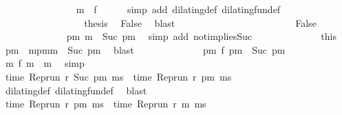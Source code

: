 \begin{isabellebody}
\ \ \ \ \ \ \ \ \ \ \ \ \ \ \isamarkupfalse%
\ {\isacartoucheopen}m\ {\isacharequal}\ f\ {}{\isacartoucheclose}\ \isamarkupfalse%
\ {\isacharasterisk}\ \isamarkupfalse%
\ {\isacharparenleft}simp\ add{\isacharcolon}\ dilating{\isacharunderscore}def\ dilating{\isacharunderscore}fun{\isacharunderscore}def{\isacharparenright}\isanewline
\ \ \ \ \ \ \ \ \ \ \ \ \ \ \isamarkupfalse%
\ \isamarkupfalse%
\ {\isacharquery}thesis\ \isamarkupfalse%
\ False\ \isamarkupfalse%
\ blast\isanewline
\ \ \ \ \ \ \ \ \ \ \isamarkupfalse%
\isanewline
\ \ \ \ \ \ \ \ \ \ \ \ \isamarkupfalse%
\ False\isanewline
\ \ \ \ \ \ \ \ \ \ \ \ \isamarkupfalse%
\ {\isacartoucheopen}{\isasymexists}pm{\isachardot}\ m\ {\isacharequal}\ Suc\ pm{\isacartoucheclose}\ \isamarkupfalse%
\ {\isacharparenleft}simp\ add{\isacharcolon}\ not{}{\isacharunderscore}implies{\isacharunderscore}Suc{\isacharparenright}\isanewline
\ \ \ \ \ \ \ \ \ \ \ \ \isamarkupfalse%
\ this\ \isamarkupfalse%
\ pm\ \ mpm{\isacharcolon}{\isacartoucheopen}m\ {\isacharequal}\ Suc\ pm{\isacartoucheclose}\ \isamarkupfalse%
\ blast\isanewline
\ \ \ \ \ \ \ \ \ \ \ \ \isamarkupfalse%
\ {\isacartoucheopen}{\isasymnexists}pm\ f\ pm\ {\isacharequal}\ Suc\ pm{\isacartoucheclose}\ \isamarkupfalse%
\ {\isacartoucheopen}{\isasymnexists}m\ f\ m\ {\isacharequal}\ m{\isacartoucheclose}\ \isamarkupfalse%
\ simp\ \isanewline
\ \ \ \ \ \ \ \ \ \ \ \ \isamarkupfalse%
\ {\isacharasterisk}\ \ \isamarkupfalse%
\ {\isacartoucheopen}time\ {\isacharparenleft}Rep{\isacharunderscore}run\ r\ {\isacharparenleft}Suc\ pm{\isacharparenright}\ ms{\isacharparenright}\ {\isacharequal}\ time\ {\isacharparenleft}Rep{\isacharunderscore}run\ r\ pm\ ms{\isacharparenright}{\isacartoucheclose}\isanewline
\ \ \ \ \ \ \ \ \ \ \ \ \ \ \isamarkupfalse%
\ dilating{\isacharunderscore}def\ dilating{\isacharunderscore}fun{\isacharunderscore}def\ \isamarkupfalse%
\ blast\isanewline
\ \ \ \ \ \ \ \ \ \ \ \ \isamarkupfalse%
\ {\isacartoucheopen}time\ {\isacharparenleft}Rep{\isacharunderscore}run\ r\ pm\ ms{\isacharparenright}\ {\isacharequal}\ time\ {\isacharparenleft}Rep{\isacharunderscore}run\ r\ m\ ms{\isacharparenright}{\isacartoucheclose}\ \isamarkupfalse%

\end{isabellebody}
